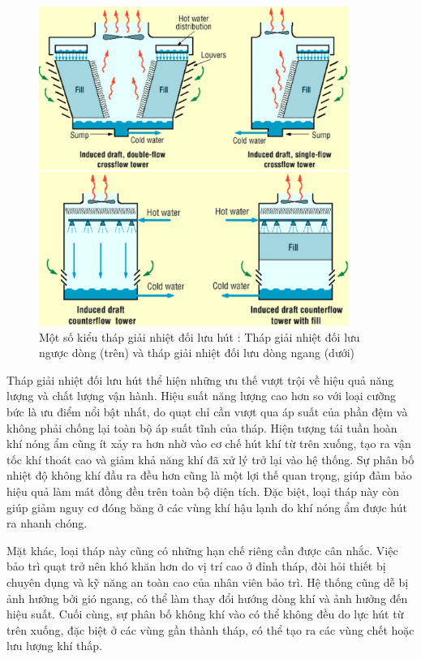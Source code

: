 \documentclass[../main.tex]{subfiles}
\begin{document}
\begin{figure}[H]
    \centering
    \includegraphics[width=0.9\textwidth]{Hinhve/doi_luu_hut.png}
    \caption{Một số kiểu tháp giải nhiệt đối lưu hút : Tháp giải nhiệt đối lưu ngược dòng (trên) và tháp giải nhiệt đối lưu dòng ngang (dưới) \cite{unep2006coolingtower_en}}
    \label{fig:doi_luu_hut}
\end{figure}

Tháp giải nhiệt đối lưu hút thể hiện những ưu thế vượt trội về hiệu quả năng lượng và chất lượng vận hành. Hiệu suất năng lượng cao hơn so với loại cưỡng bức là ưu điểm nổi bật nhất, do quạt chỉ cần vượt qua áp suất của phần đệm và không phải chống lại toàn bộ áp suất tĩnh của tháp. Hiện tượng tái tuần hoàn khí nóng ẩm cũng ít xảy ra hơn nhờ vào cơ chế hút khí từ trên xuống, tạo ra vận tốc khí thoát cao và giảm khả năng khí đã xử lý trở lại vào hệ thống. Sự phân bố nhiệt độ không khí đầu ra đều hơn cũng là một lợi thế quan trọng, giúp đảm bảo hiệu quả làm mát đồng đều trên toàn bộ diện tích. Đặc biệt, loại tháp này còn giúp giảm nguy cơ đóng băng ở các vùng khí hậu lạnh do khí nóng ẩm được hút ra nhanh chóng.

Mặt khác, loại tháp này cũng có những hạn chế riêng cần được cân nhắc. Việc bảo trì quạt trở nên khó khăn hơn do vị trí cao ở đỉnh tháp, đòi hỏi thiết bị chuyên dụng và kỹ năng an toàn cao của nhân viên bảo trì. Hệ thống cũng dễ bị ảnh hưởng bởi gió ngang, có thể làm thay đổi hướng dòng khí và ảnh hưởng đến hiệu suất. Cuối cùng, sự phân bố không khí vào có thể không đều do lực hút từ trên xuống, đặc biệt ở các vùng gần thành tháp, có thể tạo ra các vùng chết hoặc lưu lượng khí thấp.
\end{document}
